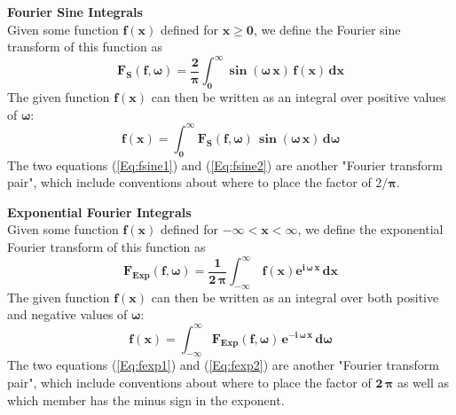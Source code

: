 \begin{compactitem}
\textbf{Fourier Sine Integrals}\\
Given some function $\mathbf{f(x)}$ defined for $\mathbf{x \geq 0}$,
  we define the Fourier sine transform  of this function as
\begin{equation}  \label{Eq:fsine1}
\mathbf{F_{S}(f,\boldsymbol{\omega}) = \frac{2}{\boldsymbol{\pi}}
  \int_{0}^{\infty} \boldsymbol{\sin}(\boldsymbol{\omega}\,x)\,f(x)\,dx }
\end{equation}
The given function $\mathbf{f(x)}$ can then be written as an integral
  over positive values of $\boldsymbol{\omega}$:
\begin{equation}  \label{Eq:fsine2}
\mathbf{f(x) = \int_{0}^{\infty} F_{S}(f,\boldsymbol{\omega})\,
    \sin(\boldsymbol{\omega}\,x)\,d\boldsymbol{\omega} }
\end{equation}
The two equations (\ref{Eq:fsine1}) and (\ref{Eq:fsine2}) are another
   "Fourier transform pair", which include conventions about where
  to place the factor of $2/\boldsymbol{\pi}$.

\textbf{Exponential Fourier Integrals}\\
Given some function $\mathbf{f(x)}$ defined for $\mathbf{-\infty <x < \infty}$,
  we define the exponential Fourier transform  of this function as
\begin{equation}  \label{Eq:fexp1}
\mathbf{F_{Exp}(f,\boldsymbol{\omega}) = \frac{1}{2\, \boldsymbol{\pi}}
  \int_{-\infty}^{\infty} \,f(x) e^{i\,\boldsymbol{\omega}\,x}\,dx }
\end{equation}
The given function $\mathbf{f(x)}$ can then be written as an integral
  over both positive and negative values of $\boldsymbol{\omega}$:
\begin{equation}  \label{Eq:fexp2}
\mathbf{f(x) = \int_{-\infty}^{\infty} F_{Exp}(f,\boldsymbol{\omega})\,
    e^{-i\,\boldsymbol{\omega}\,x} \,d\boldsymbol{\omega} }
\end{equation}
The two equations (\ref{Eq:fexp1}) and (\ref{Eq:fexp2}) are another
   "Fourier transform pair", which include conventions about where
  to place the factor of $\mathbf{2\, \boldsymbol{\pi}}$ as well as which member
  has the minus sign in the exponent.\\


\end{compactitem}
